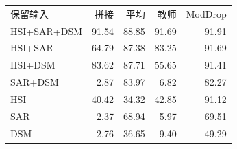 \begin{tabular}{lrrrr}
\toprule
保留输入 & 拼接 & 平均 & 教师 & ModDrop \\
HSI+SAR+DSM & 91.54 & 88.85 & 91.69 & 91.91 \\
HSI+SAR & 64.79 & 87.38 & 83.25 & 91.69 \\
HSI+DSM & 83.62 & 87.71 & 55.65 & 91.41 \\
SAR+DSM & 2.87 & 83.97 & 6.82 & 82.27 \\
HSI & 40.42 & 34.32 & 42.85 & 91.12 \\
SAR & 2.37 & 68.94 & 5.97 & 69.51 \\
DSM & 2.76 & 36.65 & 9.40 & 49.29 \\
\bottomrule
\end{tabular}
